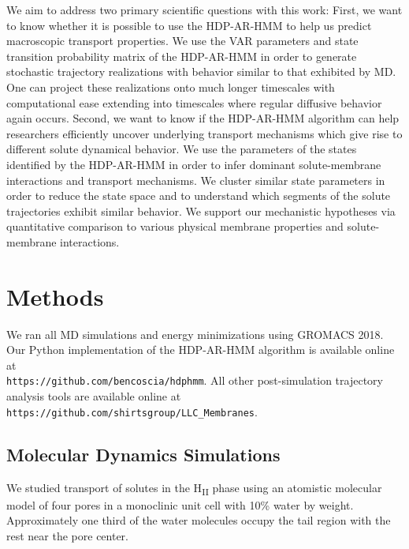 \documentclass[journal=jpcbfk,manuscript=article]{achemso}
\begin{document}
  We aim to address two primary scientific questions with this work:
  First, we want to know whether it is possible to use the HDP-AR-HMM to 
  help us predict macroscopic transport properties. We use the VAR parameters
  and state transition probability matrix of the HDP-AR-HMM in order to 
  generate stochastic trajectory realizations with behavior similar to that
  exhibited by MD. One can project these realizations onto much longer 
  timescales with computational ease extending into timescales where 
  regular diffusive behavior again occurs.
  Second, we want to know if the HDP-AR-HMM algorithm can help researchers
  efficiently uncover underlying transport mechanisms which give rise to different 
  solute dynamical behavior.
  We use the parameters of the states identified by the HDP-AR-HMM in order to infer 
  dominant solute-membrane interactions and transport mechanisms. We cluster similar 
  state parameters in order to reduce the state space and to understand which segments 
  of the solute trajectories exhibit similar behavior. We support our mechanistic 
  hypotheses via quantitative comparison to various physical membrane properties and
  solute-membrane interactions.
  
  \section{Methods}
    
  We ran all MD simulations and energy minimizations using GROMACS 2018.~\cite{bekker_gromacs:_1993,berendsen_gromacs:_1995,van_der_spoel_gromacs:_2005,hess_gromacs_2008}  
  Our Python implementation of the HDP-AR-HMM algorithm is available online at \\
  \texttt{https://github.com/bencoscia/hdphmm}. All other post-simulation 
  trajectory analysis tools are available online at
  \texttt{https://github.com/shirtsgroup/LLC\_Membranes}.

  \subsection{Molecular Dynamics Simulations}

  We studied transport of solutes in the H\textsubscript{II} phase using an
  atomistic molecular model of four pores in a monoclinic unit cell with 
  10\% water by weight. Approximately one third of the water molecules 
  occupy the tail region with the rest near the pore center.%
  
\end{document}
